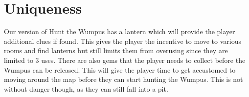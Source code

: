 \documentclass{formalLabReport} %
\begin{document}
\section{Uniqueness}

Our version of Hunt the Wumpus has a lantern which will provide the player additional clues if found. This gives the player the incentive to move to various rooms and find lanterns but still limits them from overusing since they are limited to 3 uses. There are also gems that the player needs to collect before the Wumpus can be released. This will give the player time to get accustomed to moving around the map before they can start hunting the Wumpus. This is not without danger though, as they can still fall into a pit. 
\end{document}
